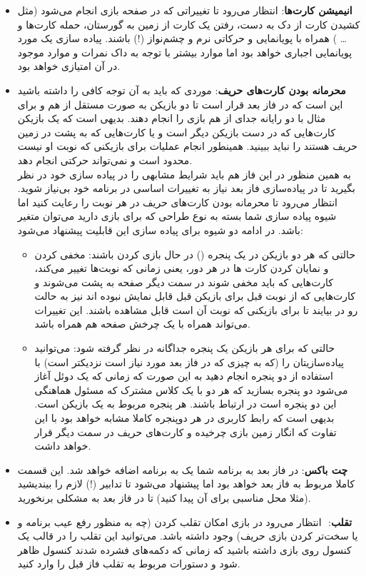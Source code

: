 \documentclass[]{article}
\begin{document}
\begin{itemize}
    
    \item \textbf{انیمیشن کارت‌ها}: انتظار می‌رود تا تغییراتی که در صفحه بازی انجام می‌شود (مثل کشیدن کارت از دک به دست، رفتن یک کارت از زمین به گورستان، حمله کارت‌ها و … ) همراه با پویانمایی و حرکاتی نرم و چشم‌نواز (!) باشند. پیاده سازی یک مورد پویانمایی اجباری خواهد بود اما موارد بیشتر با توجه به داک نمرات و موارد موجود در آن امتیازی خواهد بود.
    
    
    \item \textbf{محرمانه بودن کارت‌های حریف}:
     موردی که باید به آن توجه کافی را داشته باشید این است که در فاز بعد قرار است تا دو بازیکن به صورت مستقل از هم و برای مثال با دو رایانه جدای از هم بازی را انجام دهند. بدیهی است که یک بازیکن کارت‌هایی که در دست بازیکن دیگر است و یا کارت‌هایی که به پشت در زمین حریف‌ هستند را نباید ببینید. همینطور انجام عملیات برای بازیکنی که نوبت او نیست محدود است و نمی‌تواند حرکتی انجام دهد. \\
    به همین منظور در این فاز هم باید شرایط مشابهی را در پیاده سازی خود در نظر بگیرید تا در پیاده‌سازی فاز بعد نیاز به تغییرات اساسی در برنامه خود بی‌نیاز شوید. انتظار می‌رود تا محرمانه بودن کارت‌های حریف در هر نوبت را رعایت کنید اما شیوه  پیاده سازی شما بسته به نوع طراحی که برای بازی دارید می‌توان متغیر باشد. در ادامه دو شیوه برای پیاده سازی این قابلیت پیشنهاد می‌شود:
    \begin{itemize}
        \item حالتی که هر دو بازیکن در یک پنجره () در حال بازی کردن باشند:‌ مخفی کردن و نمایان کردن کارت ها در هر دور، یعنی زمانی که نوبت‌ها تغییر می‌کند، کارت‌هایی که باید مخفی شوند در سمت دیگر صفحه به پشت می‌شوند و کارت‌هایی که از نوبت قبل برای بازیکن قبل قابل نمایش نبوده اند نیز به حالت رو در بیایند تا برای بازیکنی که نوبت آن است قابل مشاهده باشند. این تغییرات می‌تواند همراه با یک چرخش صفحه هم همراه باشد.
        \item حالتی که برای هر بازیکن یک پنجره جداگانه در نظر گرفته شود: می‌توانید پیاده‌سازیتان را (که به چیزی که در فاز بعد مورد نیاز است نزدیکتر است) با استفاده از دو پنجره انجام دهید به این صورت که زمانی که یک دوئل آغاز می‌شود دو پنجره بسازید که هر دو با یک کلاس مشترک که مسئول هماهنگی این دو پنجره است در ارتباط باشند. هر پنجره مربوط به یک بازیکن است. بدیهی است که رابط کاربری در هر دوپنجره کاملا مشابه خواهد بود با این تفاوت که انگار زمین بازی چرخیده و کارت‌های حریف در سمت دیگر قرار خواهد داشت. 
    \end{itemize}
    \item \textbf{چت باکس}: در فاز بعد به برنامه شما یک  به برنامه اضافه خواهد شد. این قسمت کاملا مربوط به فاز بعد خواهد بود اما پیشنهاد می‌شود تا تدابیر (!) لازم را بیندیشید (مثلا محل مناسبی برای آن پیدا کنید) تا در فاز بعد به مشکلی برنخورید.
    \item \textbf{تقلب}:
    ‌ انتظار می‌رود در بازی امکان تقلب کردن (چه به منظور رفع عیب برنامه و یا سخت‌تر کردن بازی حریف) وجود داشته باشد. می‌توانید این تقلب را در قالب یک کنسول  روی بازی داشته باشید که زمانی که دکمه‌های  فشرده شدند کنسول ظاهر شود و دستورات مربوط به تقلب فاز قبل را وارد کنید.
    

\end{itemize}
\end{document}
